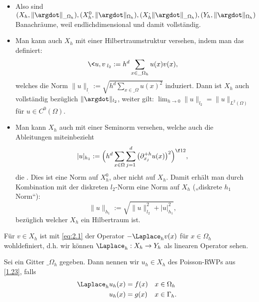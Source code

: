 \begin{nt*}[Nebenbemerkungen]
	\begin{itemize}
		\item
			Also sind $(X_h, \|\argdot\|_{\_\Omega_h}), (X_h^0, \|\argdot\|_{\Omega_h}), (X_h^ , \|\argdot\|_{\_\Omega_h}), (Y_h, \|\argdot\|_{\Omega_h})$ Banachräume, weil endlichdimensional und damit vollständig.
		\item
			Man kann auch $X_h$ mit einer Hilbertraumstruktur versehen, indem man das  definiert:
			\[
				\<u,v\>_{l_2} := h^d \sum_{x\in\_\Omega_h} u(x) v(x),
			\]
			welches die Norm $\|u\|_{l_,} := \sqrt{h^d \sum_{x\in\_\Omega} u(x)^2}$ induziert.
			Dann ist $X_h$ auch vollständig bezüglich $\|\argdot\|_{l_2}$, weiter gilt: $\lim_{h\to 0} \|u\|_{l_2} = \|u\|_{L^2(\Omega)}$ für $u \in C^0(\Omega)$.
		\item
			Man kann $X_h$ auch mit einer Seminorm versehen, welche auch die Ableitungen miteinbezieht
			\[
				|u|_{h_1}
				:= \Big( h^d \sum_{x\in\Omega} \sum_{j=1}^d  \big(\partial_{x_j}^{+h} u(x)\big)^2 \Big)^{\f 12},
			\]
			die .
			Dies ist eine Norm auf $X_h^0$, aber nicht auf $X_h$.
			Damit erhält man durch Kombination mit der diskreten $l_2$-Norm eine Norm auf $X_h$ („diskrete $h_1$ Norm“):
			\[
				\|u\|_{h_1}
				:= \sqrt{\|u\|_{l_2}^2 + |u|_{h_1}^2},
			\]
			bezüglich welcher $X_h$ ein Hilbertraum ist.
	\end{itemize}
\end{nt*}

Für $v \in X_h$ ist mit \eqref{eq:2.1} der Operator $-\Laplace_h v(x)$ für $x \in \Omega_h$ wohldefiniert, d.h. wir können $\Laplace_h : X_h \to Y_h$ als linearen Operator sehen.

\begin{df} \label{2.7}
	Sei ein Gitter $\_\Omega_h$ gegeben.
	Dann nennen wir $u_h \in X_h$  des Poisson-RWPs aus \ref{1.23}, falls
	\begin{align} \label{eq:2.2}
		\Laplace_h u_h(x) &= f(x) && \text{$x \in \Omega_h$} \\
		u_h(x) &= g(x) && \text{$x\in \Gamma_h$}. \notag
	\end{align}
\end{df}

